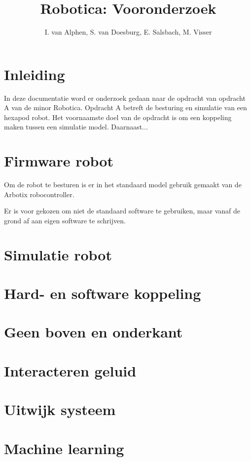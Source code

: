 \documentclass[10pt,a4paper]{article}
\title{Robotica: Vooronderzoek}
\author{I. van Alphen, S. van Doesburg, E.  Salsbach, M. Visser}
\begin{document}
\maketitle

\section{Inleiding}
In deze documentatie word er onderzoek gedaan naar de opdracht van opdracht A van de minor Robotica. Opdracht A betreft de besturing en simulatie van een hexapod robot. Het voornaamste doel van de opdracht is om een koppeling maken tussen een simulatie model. Daarnaast...

\section{Firmware robot}
Om de robot te besturen is er in het standaard model gebruik gemaakt van de Arbotix robocontroller. 

Er is voor gekozen om niet de standaard software te gebruiken, maar vanaf de grond af aan eigen software te schrijven.

\section{Simulatie robot}

\section{Hard- en software koppeling}


\section{Geen boven en onderkant}

\section{Interacteren geluid}

\section{Uitwijk systeem}

\section{Machine learning}
\end{document}
